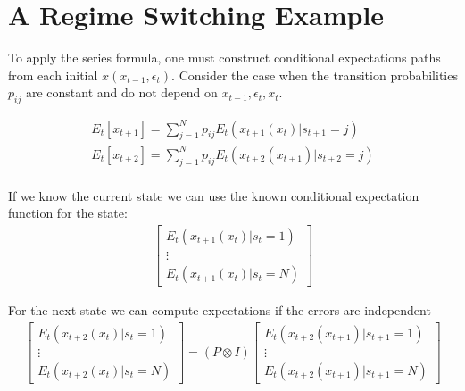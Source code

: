 \documentclass[12pt]{article}
\begin{document}






\section{A Regime Switching Example}
\label{sec:extension}
\label{sec:ressw}








\label{sec:regime-switch-model}

To apply the series formula, one must construct conditional expectations paths from each initial $x(x_{t-1},\epsilon_t)$.  Consider the case when the transition 
probabilities $p_{ij}$ are constant and do not depend on 
$x_{t-1},\epsilon_t,x_t$.

\begin{gather*}
E_t[x_{t+1}]=  \sum_{j=1}^{N} p_{ij} E_t(x_{t+1}(x_t)|s_{t+1}=j)  \\
E_t[x_{t+2}]=  \sum_{j=1}^{N} p_{ij} E_t(x_{t+2}(x_{t+1})|s_{t+2}=j)  \\
\end{gather*}

If we know the current state we can use the known conditional expectation function for the state:
\begin{gather*}
    \begin{bmatrix}
E_t(x_{t+1}(x_{t})|s_{t}=1)  \\    \vdots \\
E_t(x_{t+1}(x_{t})|s_{t}=N)  
  \end{bmatrix}
\end{gather*}

For the next state we can compute expectations if the errors are independent
\begin{gather*}
  \begin{bmatrix}
E_t(x_{t+2}(x_t)|s_{t}=1)  \\    \vdots \\
E_t(x_{t+2}(x_t)|s_{t}=N)  
  \end{bmatrix}=
(P \otimes  I)
  \begin{bmatrix}
E_t(x_{t+2}(x_{t+1})|s_{t+1}=1)  \\    \vdots \\
E_t(x_{t+2}(x_{t+1})|s_{t+1}=N)  
  \end{bmatrix}
\end{gather*}
\end{document}
